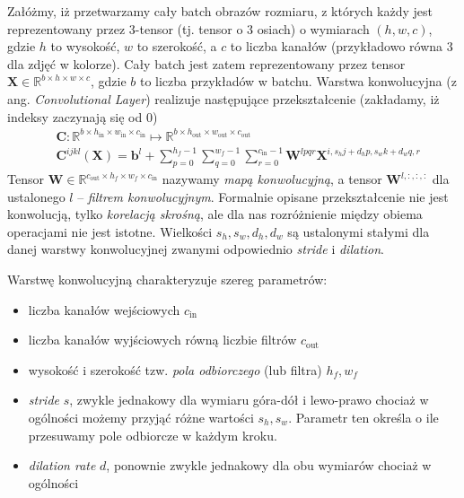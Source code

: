 \documentclass{myclass}
\numberwithin{equation}{subsection}
\begin{document}
Załóżmy, iż przetwarzamy cały batch obrazów rozmiaru, z których każdy jest reprezentowany przez
3-tensor (tj. tensor o 3 osiach) o wymiarach \((h, w, c)\), gdzie \(h\) to wysokość, \(w\) to
szerokość, a \(c\) to liczba kanałów (przykładowo równa 3 dla zdjęć w kolorze). Cały batch jest
zatem reprezentowany przez tensor \(\bm{X} \in \mathbb{R}^{b \times h \times w \times c }\), gdzie
\(b\) to liczba przykładów w batchu. Warstwa konwolucyjna (z ang. \emph{Convolutional Layer})
realizuje następujące przekształcenie (zakładamy, iż indeksy zaczynają się od 0)
\[
\boxed
{
\begin{split} 
&\bm{C}: \mathbb{R}^{b \times h_\text{in} \times w_\text{in} \times c_\text{in}} \mapsto \mathbb{R}^{b \times h_\text{out} \times w_\text{out} \times c_\text{out}}\\
&\bm{C}^{ijkl}(\bm{X}) = \bm{b}^{l} + \sum_{p = 0}^{h_f-1} \sum_{q = 0}^{w_f-1} \sum_{r = 0}^{c_\text{in}-1} \bm{W}^{lpqr} \bm{X}^{i, s_h j + d_h p, s_w k + d_w q, r}
\end{split}
}
\]
Tensor \(\bm{W} \in \mathbb{R}^{c_\text{out}\times h_f \times w_f \times c_\text{in}}\) nazywamy
\emph{mapą konwolucyjną}, a tensor \(\bm{W}^{l,:,:,:}\) dla ustalonego \(l\) -- \emph{filtrem
konwolucyjnym}. Formalnie opisane przekształcenie nie jest konwolucją, tylko \emph{korelacją
skrośną}, ale dla nas rozróżnienie między obiema operacjami nie jest istotne. Wielkości \(s_h, s_w,
d_h, d_w\) są ustalonymi stałymi dla danej warstwy konwolucyjnej zwanymi odpowiednio \emph{stride} i
\emph{dilation}.

Warstwę konwolucyjną charakteryzuje szereg parametrów:
\begin{itemize}
\item liczba kanałów wejściowych \(c_\text{in}\)
\item liczba kanałów wyjściowych równą liczbie filtrów \(c_\text{out}\)
\item wysokość i szerokość tzw. \textit{pola odbiorczego} (lub filtra) \(h_f, w_f\)
\item \textit{stride} \(s\), zwykle jednakowy dla wymiaru góra-dół i lewo-prawo chociaż w ogólności
możemy przyjąć różne wartości \(s_h, s_w\). Parametr ten określa o ile przesuwamy pole odbiorcze w
każdym kroku.
\item \textit{dilation rate} \(d\), ponownie zwykle jednakowy dla obu wymiarów chociaż w ogólności
\end{itemize}
\end{document}
